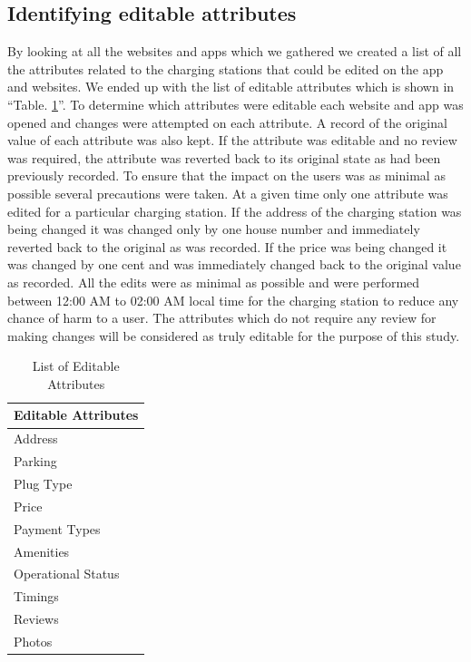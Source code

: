 \documentclass[conference]{IEEEtran}
\begin{document}
\subsection{Identifying editable attributes}
By looking at all the websites and apps which we gathered we created a list of all the attributes related to the charging stations that could be edited on the app and websites. We ended up with the list of editable attributes which is shown in ``Table. \ref{tab1}''. To determine which attributes were editable each website and app was opened and changes were attempted on each attribute. A record of the original value of each attribute was also kept. If the attribute was editable and no review was required, the attribute was reverted back to its original state as had been previously recorded. To ensure that the impact on the users was as minimal as possible several precautions were taken. At a given time only one attribute was edited for a particular charging station. If the address of the charging station was being changed it was changed only by one house number and immediately reverted back to the original as was recorded. If the price was being changed it was changed by one cent and was immediately changed back to the original value as recorded. All the edits were as minimal as possible and were performed between 12:00 AM to 02:00 AM local time for the charging station to reduce any chance of harm to a user. The attributes which do not require any review for making changes will be considered as truly editable for the purpose of this study.

\begin{table}[htbp]
\caption{List of Editable Attributes}
\begin{center}
\begin{tabular}{|l|}
\hline
\multicolumn{1}{|c|}{\textbf{Editable Attributes}} \\
\hline
Address                                          \\
Parking                                          \\
Plug Type                                        \\
Price                                            \\
Payment Types                                    \\
Amenities                                        \\
Operational Status                               \\
Timings                                          \\
Reviews                                          \\
Photos                                           \\
\hline
\end{tabular}
\label{tab1}
\end{center}
\end{table}
\end{document}
